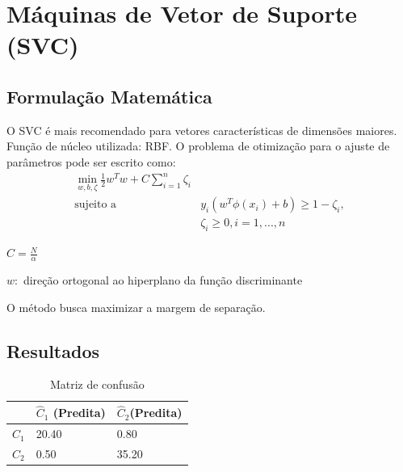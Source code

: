 \documentclass[11pt,a4paper]{article}
\numberwithin{equation}{section}
\begin{document}
\section{Máquinas de Vetor de Suporte (SVC)}
\subsection{Formulação Matemática}
O SVC é mais recomendado para vetores características de dimensões maiores.
Função de núcleo utilizada: RBF.
O problema de otimização para o ajuste de parâmetros pode ser escrito como:
\begin{align*}
\min_ {w, b, \zeta} \frac{1}{2} w^T w + C \sum_{i=1}^{n} \zeta_i \\
\textrm {sujeito a } & y_i (w^T \phi (x_i) + b) \geq 1 - \zeta_i,\\
& \zeta_i \geq 0, i=1, ..., n
\end{align*}

$C = \frac{N}{\alpha}$

$w:$ direção ortogonal ao hiperplano da função discriminante


O método busca maximizar a margem de separação.

\subsection{Resultados}
\begin{table}[H]
\centering
\caption{Matriz de confusão}
\begin{tabular}{l l l}
\hline
 & \textbf{$\hat{C}_1$ (Predita)} & \textbf{$\hat{C}_2$(Predita)}\\
\hline
$C_1$ & 20.40 & 0.80 \\
$C_2$ & 0.50  & 35.20\\ 
\hline
\end{tabular}
\end{table}
\end{document}
